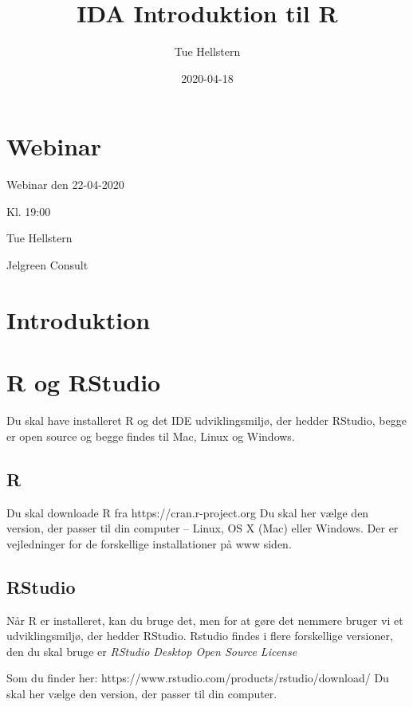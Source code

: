 \documentclass[
]{book}
\title{IDA Introduktion til R}
\author{Tue Hellstern}
\date{2020-04-18}
\begin{document}
\maketitle

{
\setcounter{tocdepth}{1}
\tableofcontents
}
\hypertarget{webinar}{%
\chapter{Webinar}\label{webinar}}

Webinar den 22-04-2020

Kl. 19:00

Tue Hellstern

Jelgreen Consult

\hypertarget{intro}{%
\chapter{Introduktion}\label{intro}}

\hypertarget{R_RStudio}{%
\chapter{R og RStudio}\label{R_RStudio}}

Du skal have installeret R og det IDE udviklingsmiljø, der hedder RStudio, begge er open source og begge findes til Mac, Linux og Windows.

\hypertarget{r}{%
\section{R}\label{r}}

Du skal downloade R fra
https://cran.r-project.org
Du skal her vælge den version, der passer til din computer -- Linux, OS X (Mac) eller Windows.
Der er vejledninger for de forskellige installationer på www siden.

\hypertarget{rstudio}{%
\section{RStudio}\label{rstudio}}

Når R er installeret, kan du bruge det, men for at gøre det nemmere bruger vi et udviklingsmiljø, der hedder RStudio. Rstudio findes i flere forskellige versioner, den du skal bruge er \emph{RStudio Desktop Open Source License}

Som du finder her: https://www.rstudio.com/products/rstudio/download/
Du skal her vælge den version, der passer til din computer.
\end{document}
